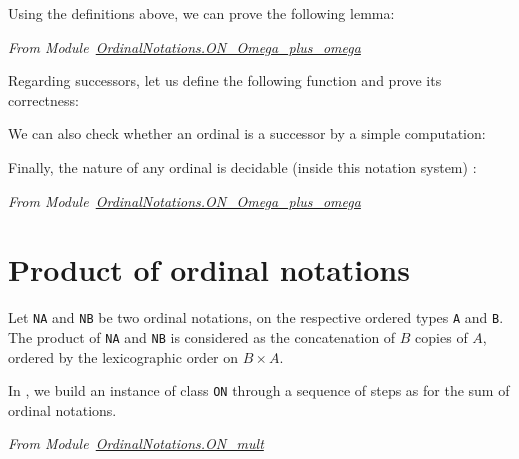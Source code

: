 Using the definitions above, we can prove the following lemma:

\vspace{4pt}

\noindent\emph{From Module~\href{../theories/html/hydras.OrdinalNotations.ON_Omega_plus_omega.html}{OrdinalNotations.ON\_Omega\_plus\_omega}}



\vspace{4pt}

Regarding successors, let us define the following function and prove its correctness:






\vspace{4pt}



We can also check whether an ordinal is a successor by a simple computation:



\vspace{4pt}

Finally, the nature of any ordinal is decidable (inside this notation system) :



\noindent\emph{From Module~\href{../theories/html/hydras.OrdinalNotations.ON_Omega_plus_omega.html}{OrdinalNotations.ON\_Omega\_plus\_omega}}



\section{Product of ordinal notations}

Let \texttt{NA} and \texttt{NB} be two ordinal notations, on the respective  ordered types \texttt{A} and \texttt{B}. The product of \texttt{NA} and \texttt{NB} is considered as the concatenation of $B$ copies of $A$, ordered by the lexicographic order on $B\times A$.

In \coq{}, we build an instance of class \texttt{ON} through a sequence of steps as for the sum of ordinal notations.

\vspace{4pt}
\noindent
\emph{From Module~\href{../theories/html/hydras.OrdinalNotations.ON_mult.html}{OrdinalNotations.ON\_mult}}

